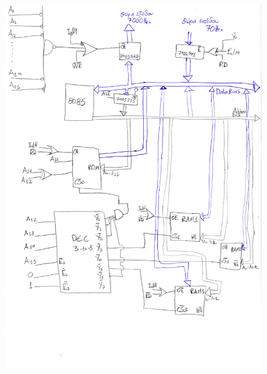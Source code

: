 \documentclass[a4paper]{article}
\begin{document}
\begin{figure}[H]
	\includegraphics[width=\textwidth]{image2.jpg}
\end{figure}
\end{document}
